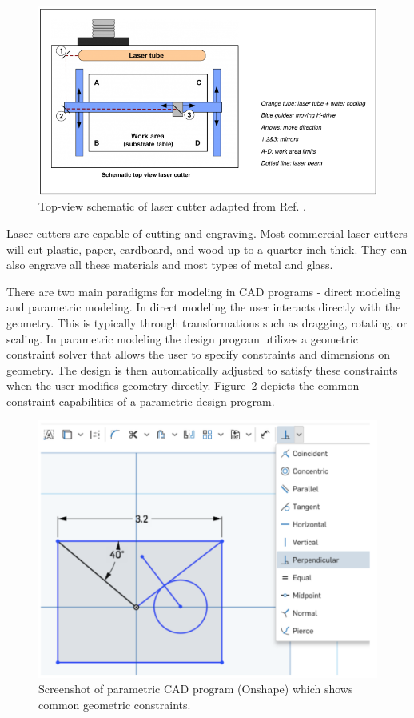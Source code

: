 \begin{figure}[H]
  \includegraphics[width=\linewidth]{lasersystem.jpg}
  \caption{Top-view schematic of laser cutter adapted from Ref. \cite{laos}.}
  \label{fig:lasersystem}
\end{figure}

Laser cutters are capable of cutting and engraving. Most commercial laser cutters will cut plastic, paper, cardboard, and wood up to a quarter inch thick. They can also engrave all these materials and most types of metal and glass.

There are two main paradigms for modeling in CAD programs - direct modeling and parametric modeling. In direct modeling the user interacts directly with the geometry. This is typically through transformations such as dragging, rotating, or scaling. In parametric modeling the design program utilizes a geometric constraint solver that allows the user to specify constraints and dimensions on geometry. The design is then automatically adjusted to satisfy these constraints when the user modifies geometry directly. Figure~\ref{fig:parametricProgram} depicts the common constraint capabilities of a parametric design program.

\begin{figure}[H]
  \includegraphics[width=\linewidth]{parametricProgram.jpg}
  \caption{Screenshot of parametric CAD program (Onshape) which shows common geometric constraints.}
  \label{fig:parametricProgram}
\end{figure}

